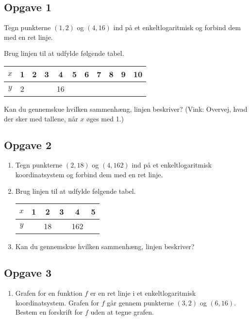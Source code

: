 \subsection*{Opgave 1}
\begin{enumerate}[label=\roman*)]
	\item Tegn punkterne $(1,2)$ og $(4,16)$ ind på et enkeltlogaritmisk og forbind dem med en ret 
	linje.
	\item Brug linjen til at udfylde følgende tabel.
	\begin{center}
		\begin{tabular}{c|c|c|c|c|c|c|c|c|c|c}
			$x$ & 1 & 2 & 3 & 4 & 5 & 6 & 7 & 8 & 9 & 10 \\
			\hline
			$y$ & 2 & \phantom{4}  & \phantom{8}  &16 & \phantom{32}  & \phantom{64}  & \phantom{128}  & \phantom{256}  & \phantom{512}  & \phantom{1024}
		\end{tabular}
	\item Kan du gennemskue hvilken sammenhæng, linjen beskriver? (Vink: Overvej, hvad der sker med
	tallene, når $x$ øges med 1.)
	\end{center}
\end{enumerate}

\subsection*{Opgave 2}
\begin{enumerate}[label=\roman*)]
	\item Tegn punkterne $(2,18)$ og $(4,162)$ ind på et enkeltlogaritmisk koordinatsystem og forbind dem med en ret 
	linje.
	\item Brug linjen til at udfylde følgende tabel.
	\begin{center}
		\begin{tabular}{c|c|c|c|c|c}
			$x$ & 1 & 2 & 3 & 4 & 5  \\
			\hline
			$y$ & \phantom{6} & 18 & \phantom{54} & 162 & \phantom{486}
		\end{tabular}
	\end{center}
	\item Kan du gennemskue hvilken sammenhæng, linjen beskriver? 
\end{enumerate}

\subsection*{Opgave 3}

\begin{enumerate}[label=\roman*)]
	\item Grafen for en funktion $f$ er en ret linje i et enkeltlogaritmisk koordinatsystem. Grafen for $f$ går 
	gennem punkterne $(3,2)$ og $(6,16)$. Bestem en forskrift for $f$ uden at tegne grafen.
\end{enumerate}

